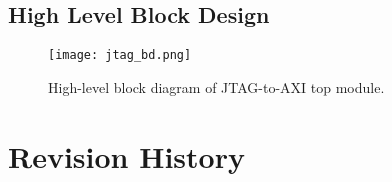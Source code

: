\documentclass[fleqn,10pt]{SelfArx} %
\begin{document}
\subsection{High Level Block Design}
\begin{figure}[!ht]\centering %
	\texttt{[image: jtag\_bd.png]}
	\caption{High-level block diagram of JTAG-to-AXI top module.}
	\label{fig:high_level_bd}
\end{figure}

\FloatBarrier
\vfill
\newpage

\section {Revision History}
\end{document}
